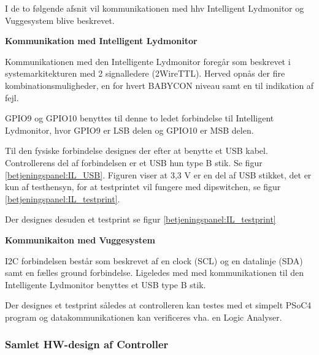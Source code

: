 I de to følgende afsnit vil kommunikationen med hhv Intelligent Lydmonitor og Vuggesystem blive beskrevet.

\textbf{Kommunikation med Intelligent Lydmonitor}

Kommunikationen med den Intelligente Lydmonitor foregår som beskrevet i systemarkitekturen med 2 signalledere (2WireTTL). Herved opnås der fire kombinationsmuligheder, en for hvert BABYCON niveau samt en til indikation  af fejl.

GPIO9 og GPIO10 benyttes til denne to ledet forbindelse til Intelligent Lydmonitor, hvor GPIO9 er LSB delen og GPIO10 er MSB delen. 

Til den fysiske forbindelse designes der efter at benytte et USB kabel. Controllerens del af forbindelsen er et USB hun type B stik. Se figur \ref{betjeningspanel:IL_USB}. Figuren viser at 3,3 V er en del af USB stikket, det er kun af testhensyn, for at testprintet vil fungere med dipswitchen, se figur \ref{betjeningspanel:IL_testprint}.

 
Der designes desuden et testprint se figur  \ref{betjeningspanel:IL_testprint}


\textbf{Kommunikaiton med Vuggesystem}

I2C forbindelsen består som beskrevet af en clock (SCL) og en datalinje (SDA) samt en fælles ground forbindelse. Ligeledes med med kommunikationen til den Intelligente Lydmonitor benyttes et USB type B stik.


Der designes et testprint således at controlleren kan testes med et simpelt PSoC4 program og datakommunikationen kan verificeres vha. en Logic Analyser.


\subsubsection*{Samlet HW-design af Controller}

